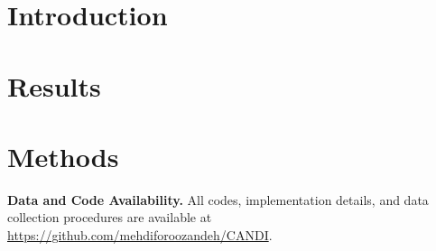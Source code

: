 \documentclass[a4paper, 11pt]{article}
\begin{document}
\section{Introduction}
    


\section{Results}\label{results}
    


% 
% 
% 
% 

\section{Methods}
    

\noindent\textbf{Data and Code Availability.} All codes, implementation details, and data collection procedures are available at \url{https://github.com/mehdiforoozandeh/CANDI}.




\end{document}
